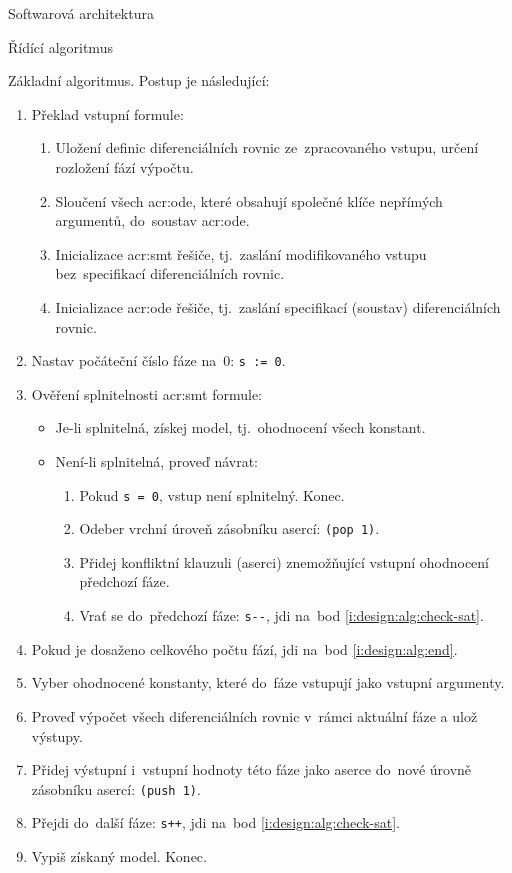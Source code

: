 \documentclass[thesis=M,czech]{FITthesis}[2012/06/26]
\newcommand{\acrlabel}[1]{acr:#1}
\newcommand{\acr}[1]{\acrshort{\acrlabel{#1}}}
\newcommand{\id}[1]{\texttt{#1}}
\newcommand{\rf}[1]{\ref{#1}}
\begin{document}
\begin{section}{Softwarová architektura}
\begin{subsection}{Řídící algoritmus}
\begin{paragraph}{Základní algoritmus.}
Postup je následující:
\begin{enumerate}
\item Překlad vstupní formule:
   \begin{enumerate}
   \item Uložení definic diferenciálních rovnic
      ze~zpracovaného vstupu, určení rozložení fází výpočtu.
   \item Sloučení všech \acr{ode}, které obsahují
      společné klíče nepřímých argumentů,
      do~soustav \acr{ode}.
   \item Inicializace \acr{smt} řešiče,
      tj.~zaslání modifikovaného vstupu
      bez~specifikací diferenciálních rovnic.
   \item Inicializace \acr{ode} řešiče,
      tj.~zaslání specifikací (soustav) diferenciálních rovnic.
   \end{enumerate}
\item Nastav počáteční číslo fáze na~$0$: \id{s~:= 0}.
\item \label{i:design:alg:check-sat}
   Ověření splnitelnosti \acr{smt} formule:
   \begin{itemize}
   \item Je-li splnitelná, získej model,
      tj.~ohodnocení všech konstant.
   \item Není-li splnitelná, proveď návrat:
      \begin{enumerate}
      \item Pokud \id{s = 0}, vstup není splnitelný. Konec.
      \item Odeber vrchní úroveň zásobníku asercí: \id{(pop~1)}.
      \item Přidej konfliktní klauzuli (aserci)
         znemožňující vstupní ohodnocení předchozí fáze.
      \item Vrať se do~předchozí fáze:
         \id{s-{}-}, jdi na~bod \rf{i:design:alg:check-sat}.
      \end{enumerate}
   \end{itemize}
\item Pokud je dosaženo celkového počtu fází,
   jdi na~bod \rf{i:design:alg:end}.
\item Vyber ohodnocené konstanty,
   které do~fáze vstupují jako vstupní argumenty.
\item Proveď výpočet všech diferenciálních rovnic
   v~rámci aktuální fáze a ulož výstupy.
\item Přidej výstupní i~vstupní hodnoty této fáze
   jako aserce do~nové úrovně zásobníku asercí: \id{(push~1)}.
\item Přejdi do~další fáze: \id{s+{}+},
   jdi na~bod \rf{i:design:alg:check-sat}.
\item \label{i:design:alg:end}
   Vypiš získaný model. Konec.
\end{enumerate}


\end{paragraph}
\end{subsection}
\end{section}
\end{document}
